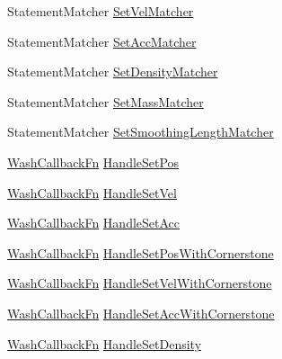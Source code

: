 \begin{DoxyCompactItemize}
\item 
Statement\+Matcher \mbox{\hyperlink{namespacews2st_1_1refactor_1_1forces_ae4f5b720f29011583bcc21d18fad0853}{Set\+Vel\+Matcher}}
\item 
Statement\+Matcher \mbox{\hyperlink{namespacews2st_1_1refactor_1_1forces_a5a46fef8e676edadd79ef4ff2ca16956}{Set\+Acc\+Matcher}}
\item 
Statement\+Matcher \mbox{\hyperlink{namespacews2st_1_1refactor_1_1forces_afa5b98b9546988398a87b6437fd18f0e}{Set\+Density\+Matcher}}
\item 
Statement\+Matcher \mbox{\hyperlink{namespacews2st_1_1refactor_1_1forces_a448bc6dee79dc678d66ed32cda898bee}{Set\+Mass\+Matcher}}
\item 
Statement\+Matcher \mbox{\hyperlink{namespacews2st_1_1refactor_1_1forces_afeff1cc5170c1646c79cc15253654fc8}{Set\+Smoothing\+Length\+Matcher}}
\item 
\mbox{\hyperlink{namespacews2st_a682dfda40d8282c7e579a7b826a7d861}{Wash\+Callback\+Fn}} \mbox{\hyperlink{namespacews2st_1_1refactor_1_1forces_a98d52c6123f3e0afe59a2e20e1071433}{Handle\+Set\+Pos}}
\item 
\mbox{\hyperlink{namespacews2st_a682dfda40d8282c7e579a7b826a7d861}{Wash\+Callback\+Fn}} \mbox{\hyperlink{namespacews2st_1_1refactor_1_1forces_adc3822625b91b4094517de19c8a0ee2c}{Handle\+Set\+Vel}}
\item 
\mbox{\hyperlink{namespacews2st_a682dfda40d8282c7e579a7b826a7d861}{Wash\+Callback\+Fn}} \mbox{\hyperlink{namespacews2st_1_1refactor_1_1forces_aac8387c5a35d43be7a798e5b8cc9890b}{Handle\+Set\+Acc}}
\item 
\mbox{\hyperlink{namespacews2st_a682dfda40d8282c7e579a7b826a7d861}{Wash\+Callback\+Fn}} \mbox{\hyperlink{namespacews2st_1_1refactor_1_1forces_a7bf8fc16b8a95fb4b226d09b0db6755a}{Handle\+Set\+Pos\+With\+Cornerstone}}
\item 
\mbox{\hyperlink{namespacews2st_a682dfda40d8282c7e579a7b826a7d861}{Wash\+Callback\+Fn}} \mbox{\hyperlink{namespacews2st_1_1refactor_1_1forces_ab48513ad240b7e4bc56c0d60f6c55faa}{Handle\+Set\+Vel\+With\+Cornerstone}}
\item 
\mbox{\hyperlink{namespacews2st_a682dfda40d8282c7e579a7b826a7d861}{Wash\+Callback\+Fn}} \mbox{\hyperlink{namespacews2st_1_1refactor_1_1forces_a5084019f947ff58607868cc352b898e0}{Handle\+Set\+Acc\+With\+Cornerstone}}
\item 
\mbox{\hyperlink{namespacews2st_a682dfda40d8282c7e579a7b826a7d861}{Wash\+Callback\+Fn}} \mbox{\hyperlink{namespacews2st_1_1refactor_1_1forces_a077b7e7f20c9fe7915643e0eeab9669c}{Handle\+Set\+Density}}

\end{DoxyCompactItemize}
